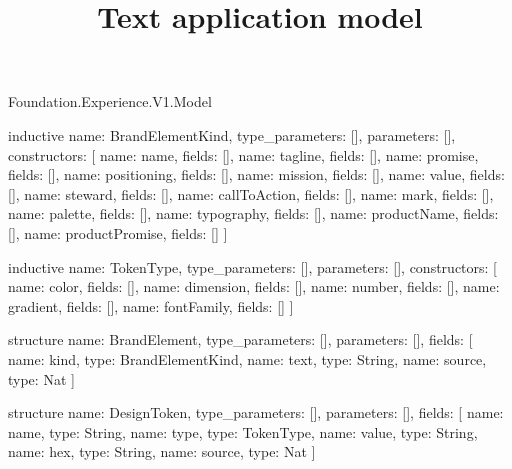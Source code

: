 \begin{lexlean}{Foundation.Experience.V1.Model}
\title{Text application model}
\begin{semanticmodule}
inductive{
  name: BrandElementKind,
  type_parameters: [],
  parameters: [],
  constructors: [
    {name: name, fields: []},
    {name: tagline, fields: []},
    {name: promise, fields: []},
    {name: positioning, fields: []},
    {name: mission, fields: []},
    {name: value, fields: []},
    {name: steward, fields: []},
    {name: callToAction, fields: []},
    {name: mark, fields: []},
    {name: palette, fields: []},
    {name: typography, fields: []},
    {name: productName, fields: []},
    {name: productPromise, fields: []}
  ]
}

inductive{
  name: TokenType,
  type_parameters: [],
  parameters: [],
  constructors: [
    {name: color, fields: []},
    {name: dimension, fields: []},
    {name: number, fields: []},
    {name: gradient, fields: []},
    {name: fontFamily, fields: []}
  ]
}

structure{
  name: BrandElement,
  type_parameters: [],
  parameters: [],
  fields: [
    {name: kind, type: BrandElementKind},
    {name: text, type: String},
    {name: source, type: Nat}
  ]
}

structure{
  name: DesignToken,
  type_parameters: [],
  parameters: [],
  fields: [
    {name: name, type: String},
    {name: type, type: TokenType},
    {name: value, type: String},
    {name: hex, type: String},
    {name: source, type: Nat}
  ]
}
\end{semanticmodule}
\end{lexlean}
